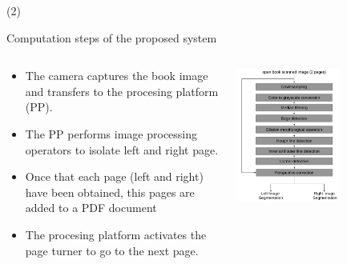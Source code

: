 \begin{frame}{  (2)}
\begin{block}{Computation steps of the proposed system} 
\begin{columns}
\begin{column}{0.5\textwidth}
		\begin{itemize}
		\item The camera captures the book image and transfers to the procesing platform (PP). 
		\item The PP performs image processing operators to isolate left and right page.
		\item Once that each page (left and right) have been obtained, this pages are added to a PDF document
		\item The procesing platform activates the page turner to go to the next page.
		\end{itemize}
\end{column}
\begin{column}{0.5\textwidth}  
    \begin{center}
     \includegraphics[width=0.60\textwidth]{Figs/DiagramaABloques_Escaner}

     \end{center}
\end{column}
\end{columns}
\end{block} 
\end{frame}


